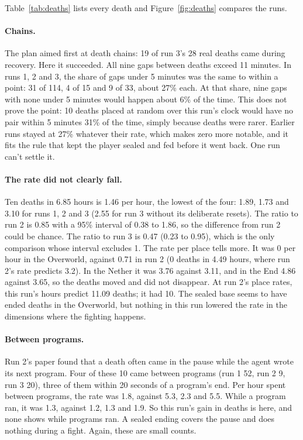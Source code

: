 \documentclass[11pt,a4paper]{article}
\begin{document}
Table~\ref{tab:deaths} lists every death and Figure~\ref{fig:deaths} compares the runs.

\paragraph{Chains.} The plan aimed first at death chains: 19 of run 3's 28 real deaths came during recovery. Here it succeeded. All nine gaps between deaths exceed 11 minutes. In runs 1, 2 and 3, the share of gaps under 5 minutes was the same to within a point: 31 of 114, 4 of 15 and 9 of 33, about 27\% each. At that share, nine gaps with none under 5 minutes would happen about 6\% of the time. This does not prove the point: 10 deaths placed at random over this run's clock would have no pair within 5 minutes 31\% of the time, simply because deaths were rarer. Earlier runs stayed at 27\% whatever their rate, which makes zero more notable, and it fits the rule that kept the player sealed and fed before it went back. One run can't settle it.

\paragraph{The rate did not clearly fall.} Ten deaths in 6.85 hours is 1.46 per hour, the lowest of the four: 1.89, 1.73 and 3.10 for runs 1, 2 and 3 (2.55 for run 3 without its deliberate resets). The ratio to run 2 is 0.85 with a 95\% interval of 0.38 to 1.86, so the difference from run 2 could be chance. The ratio to run 3 is 0.47 (0.23 to 0.95), which is the only comparison whose interval excludes 1. The rate per place tells more. It was 0 per hour in the Overworld, against 0.71 in run 2 (0 deaths in 4.49 hours, where run 2's rate predicts 3.2). In the Nether it was 3.76 against 3.11, and in the End 4.86 against 3.65, so the deaths moved and did not disappear. At run 2's place rates, this run's hours predict 11.09 deaths; it had 10. The sealed base seems to have ended deaths in the Overworld, but nothing in this run lowered the rate in the dimensions where the fighting happens.

\paragraph{Between programs.} Run 2's paper found that a death often came in the pause while the agent wrote its next program. Four of these 10 came between programs (run 1 52, run 2 9, run 3 20), three of them within 20 seconds of a program's end. Per hour spent between programs, the rate was 1.8, against 5.3, 2.3 and 5.5. While a program ran, it was 1.3, against 1.2, 1.3 and 1.9. So this run's gain in deaths is here, and none shows while programs ran. A sealed ending covers the pause and does nothing during a fight. Again, these are small counts.
\end{document}
